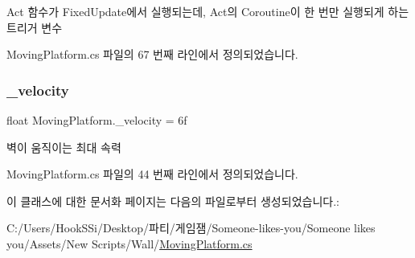 Act 함수가 Fixed\+Update에서 실행되는데, Act의 Coroutine이 한 번만 실행되게 하는 트리거 변수 



Moving\+Platform.\+cs 파일의 67 번째 라인에서 정의되었습니다.

\mbox{\label{class_moving_platform_a831cd24df75aa37f0897741d189686a7}} 
\subsubsection{\texorpdfstring{\_velocity}{\_velocity}}
{\footnotesize\ttfamily float Moving\+Platform.\+\_\+velocity = 6f}



벽이 움직이는 최대 속력 



Moving\+Platform.\+cs 파일의 44 번째 라인에서 정의되었습니다.



이 클래스에 대한 문서화 페이지는 다음의 파일로부터 생성되었습니다.\+:\begin{DoxyCompactItemize}
\item 
C\+:/\+Users/\+Hook\+S\+Si/\+Desktop/파티/게임잼/\+Someone-\/likes-\/you/\+Someone likes you/\+Assets/\+New Scripts/\+Wall/\mbox{\hyperlink{_moving_platform_8cs}{Moving\+Platform.\+cs}}\end{DoxyCompactItemize}
